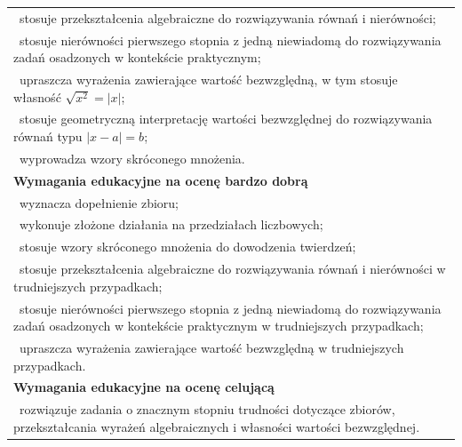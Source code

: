 \documentclass[12pt,a4paper]{article}
\begin{document}
\begin{longtable}{|p{16cm}|}
		\textbullet\ stosuje przekształcenia algebraiczne do rozwiązywania równań i nierówności; \\
		
		\textbullet\ stosuje nierówności pierwszego stopnia z jedną niewiadomą do rozwiązywania zadań osadzonych w kontekście praktycznym; \\
		
		\textbullet\ upraszcza wyrażenia zawierające wartość bezwzględną, w tym stosuje własność $\sqrt{x^2}=|x|$; \\
		
		\textbullet\ stosuje geometryczną interpretację wartości bezwzględnej do rozwiązywania równań typu $|x-a|=b$; \\
		
		\textbullet\ wyprowadza wzory skróconego mnożenia. \\ \hline
		
		\textbf{Wymagania edukacyjne na ocenę bardzo dobrą} \\ \hline
		
		\textbullet\ wyznacza dopełnienie zbioru; \\
		
		\textbullet\ wykonuje złożone działania na przedziałach liczbowych; \\
		
		\textbullet\ stosuje wzory skróconego mnożenia do dowodzenia twierdzeń; \\
		
		\textbullet\ stosuje przekształcenia algebraiczne do rozwiązywania równań i nierówności w trudniejszych przypadkach; \\
		
		\textbullet\ stosuje nierówności pierwszego stopnia z jedną niewiadomą do rozwiązywania zadań osadzonych w kontekście praktycznym w trudniejszych przypadkach; \\
		
		\textbullet\ upraszcza wyrażenia zawierające wartość bezwzględną w trudniejszych przypadkach. \\ \hline
		
		\textbf{Wymagania edukacyjne na ocenę celującą} \\ \hline
		
		\textbullet\ rozwiązuje zadania o znacznym stopniu trudności dotyczące zbiorów, przekształcania wyrażeń algebraicznych i własności wartości bezwzględnej. \\ \hline
		
	\end{longtable}
	
\end{document}
